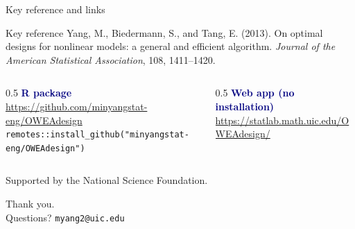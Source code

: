 \documentclass[aspectratio=169,10pt]{beamer}
\newcommand{\key}[1]{\textcolor{navy}{\textbf{#1}}}
\begin{document}
\begin{frame}{Key reference and links}
  \begin{block}{Key reference}
    Yang, M., Biedermann, S., and Tang, E. (2013). On optimal designs for nonlinear models: a general and efficient algorithm.
    \emph{Journal of the American Statistical Association}, 108, 1411--1420.
  \end{block}
  \vspace{1em}
  \begin{columns}[T]
    \begin{column}{0.5\textwidth}
      \key{R package}\\ {\footnotesize\url{https://github.com/minyangstat-eng/OWEAdesign}}\\[3pt]
      {\scriptsize\texttt{remotes::install\_github("minyangstat-eng/OWEAdesign")}}
    \end{column}
    \begin{column}{0.5\textwidth}
      \key{Web app (no installation)}\\ {\footnotesize\url{https://statlab.math.uic.edu/OWEAdesign/}}
    \end{column}
  \end{columns}
  \vspace{1.2em}
  {\small Supported by the National Science Foundation.}
\end{frame}

\begin{frame}[standout]
  Thank you.\\[0.5em]
  {\normalsize Questions? \qquad \texttt{myang2@uic.edu}}
\end{frame}
\end{document}
